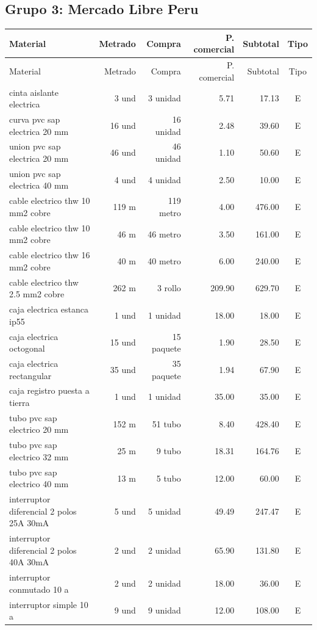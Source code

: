 \subsection{Grupo 3: Mercado Libre Peru}
\scriptsize
\begin{longtable}{p{6.0cm}r r r r c}
\toprule Material & Metrado & Compra & P. comercial & Subtotal & Tipo \\ \midrule
\endfirsthead\toprule Material & Metrado & Compra & P. comercial & Subtotal & Tipo \\ \midrule\endhead
cinta aislante electrica & 3 und & 3 unidad & 5.71 & 17.13 & E \\
curva pvc sap electrica 20 mm & 16 und & 16 unidad & 2.48 & 39.60 & E \\
union pvc sap electrica 20 mm & 46 und & 46 unidad & 1.10 & 50.60 & E \\
union pvc sap electrica 40 mm & 4 und & 4 unidad & 2.50 & 10.00 & E \\
cable electrico thw 10 mm2 cobre & 119 m & 119 metro & 4.00 & 476.00 & E \\
cable electrico thw 10 mm2 cobre & 46 m & 46 metro & 3.50 & 161.00 & E \\
cable electrico thw 16 mm2 cobre & 40 m & 40 metro & 6.00 & 240.00 & E \\
cable electrico thw 2.5 mm2 cobre & 262 m & 3 rollo & 209.90 & 629.70 & E \\
caja electrica estanca ip55 & 1 und & 1 unidad & 18.00 & 18.00 & E \\
caja electrica octogonal & 15 und & 15 paquete & 1.90 & 28.50 & E \\
caja electrica rectangular & 35 und & 35 paquete & 1.94 & 67.90 & E \\
caja registro puesta a tierra & 1 und & 1 unidad & 35.00 & 35.00 & E \\
tubo pvc sap electrico 20 mm & 152 m & 51 tubo & 8.40 & 428.40 & E \\
tubo pvc sap electrico 32 mm & 25 m & 9 tubo & 18.31 & 164.76 & E \\
tubo pvc sap electrico 40 mm & 13 m & 5 tubo & 12.00 & 60.00 & E \\
interruptor diferencial 2 polos 25A 30mA & 5 und & 5 unidad & 49.49 & 247.47 & E \\
interruptor diferencial 2 polos 40A 30mA & 2 und & 2 unidad & 65.90 & 131.80 & E \\
interruptor conmutado 10 a & 2 und & 2 unidad & 18.00 & 36.00 & E \\
interruptor simple 10 a & 9 und & 9 unidad & 12.00 & 108.00 & E \\

\end{longtable}
